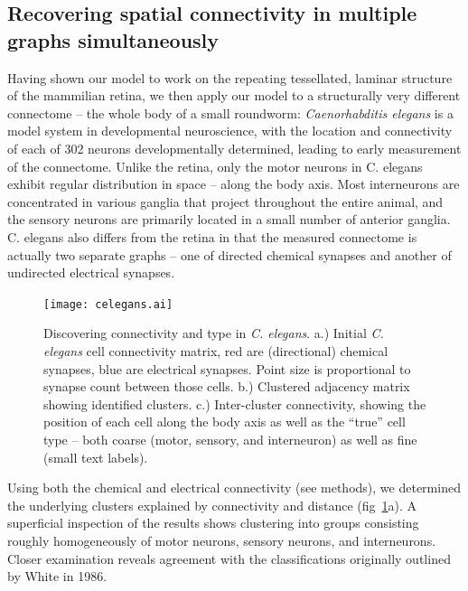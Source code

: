 \documentclass{article}
\begin{document}


\subsection*{Recovering spatial connectivity in multiple graphs simultaneously}

Having shown our model to work on the repeating tessellated, laminar structure of the mammilian retina, we then apply our model to a structurally very different connectome -- the whole body of a small roundworm: 
\textit{Caenorhabditis elegans} is a model system in
developmental neuroscience\autocite{White1986}, with the location and
connectivity of each of 302 neurons developmentally determined,
leading to early measurement of the connectome. Unlike the retina,
only the motor neurons in C. elegans exhibit regular distribution in
space -- along the body axis. Most interneurons are
concentrated in various ganglia that project throughout the entire
animal, and the sensory neurons are primarily located in a small
number of anterior ganglia. C. elegans also differs from the retina in that the measured connectome is actually two separate graphs -- one of directed chemical synapses and another of undirected electrical synapses. 

\begin{figure}
  \centering 
  \centerline{\texttt{[image: celegans.ai]}}
  \caption{Discovering connectivity and type in \textit{C. elegans}. 
 a.) Initial
    \textit{C. elegans} cell connectivity matrix, red are
    (directional) chemical synapses, blue are electrical
    synapses. Point size is proportional to synapse count between
    those cells. b.) Clustered adjacency matrix showing identified
    clusters. c.) Inter-cluster connectivity, showing the position of
    each cell along the body axis as well as the ``true'' cell type --
    both coarse (motor, sensory, and interneuron) as well as fine
    (small text labels). }
  \label{fig:celegans}
\end{figure}



Using both the chemical and electrical connectivity (see methods), we
determined the underlying clusters explained by connectivity and
distance (fig~\ref{fig:celegans}a). A superficial inspection of the results shows
clustering into groups consisting roughly homogeneously of motor
neurons, sensory neurons, and interneurons. Closer examination reveals
agreement with the classifications originally outlined by White in
1986.  
\end{document}
